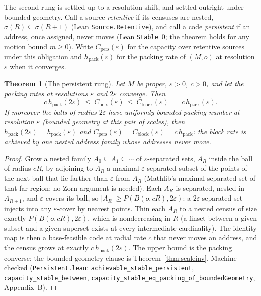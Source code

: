 \documentclass[11pt,reqno]{amsart}
\theoremstyle{plain}
\newtheorem{theorem}{Theorem}[section]
\theoremstyle{definition}
\newcommand{\hpack}{h_{\mathrm{pack}}}
\newcommand{\Cblock}{C_{\mathrm{block}}}
\newcommand{\eps}{\varepsilon}
\begin{document}
The second rung is settled up to a resolution shift, and settled outright under bounded geometry. Call a source \emph{retentive} if its censuses are nested, $\sigma(R)\subseteq\sigma(R{+}1)$ (Lean \texttt{Source.Retentive}), and call a code \emph{persistent} if an address, once assigned, never moves (Lean \texttt{Stable}~$0$; the theorem holds for any motion bound $m\ge0$). Write $C_{\mathrm{pers}}(\eps)$ for the capacity over retentive sources under this obligation and $\hpack(\eps)$ for the packing rate of $(M,o)$ at resolution $\eps$ when it converges.

\begin{theorem}[The persistent rung]\label{thm:persistent}
Let $M$ be proper, $\eps>0$, $c>0$, and let the packing rates at resolutions $\eps$ and $2\eps$ converge. Then
\[
c\,\hpack(2\eps)\ \le\ C_{\mathrm{pers}}(\eps)\ \le\ \Cblock(\eps)\ =\ c\,\hpack(\eps).
\]
If moreover the balls of radius $2\eps$ have uniformly bounded packing number at resolution $\eps$ (bounded geometry at this pair of scales), then $\hpack(2\eps)=\hpack(\eps)$ and $C_{\mathrm{pers}}(\eps)=\Cblock(\eps)=c\,\hpack$: the block rate is achieved by one nested address family whose addresses never move.
\end{theorem}

\begin{proof}
Grow a nested family $A_0\subseteq A_1\subseteq\cdots$ of $\eps$-separated sets, $A_R$ inside the ball of radius $cR$, by adjoining to $A_R$ a maximal $\eps$-separated subset of the points of the next ball that lie farther than $\eps$ from $A_R$ (Mathlib's maximal separated set of that far region; no Zorn argument is needed). Each $A_R$ is separated, nested in $A_{R+1}$, and $\eps$-covers its ball, so $|A_R|\ge P(B(o,cR),2\eps)$: a $2\eps$-separated set injects into any $\eps$-cover by nearest points. Thin each $A_R$ to a nested census of size exactly $P(B(o,cR),2\eps)$, which is nondecreasing in $R$ (a finset between a given subset and a given superset exists at every intermediate cardinality). The identity map is then a base-feasible code at radial rate $c$ that never moves an address, and the census grows at exactly $c\,\hpack(2\eps)$. The upper bound is the packing converse; the bounded-geometry clause is Theorem~\ref{thm:scaleinv}. Machine-checked (\texttt{Persistent.lean}: \texttt{achievable\_stable\_persistent}, \texttt{capacity\_stable\_between}, \texttt{capacity\_stable\_eq\_packing\_of\_boundedGeometry}, Appendix~B).
\end{proof}
\end{document}
